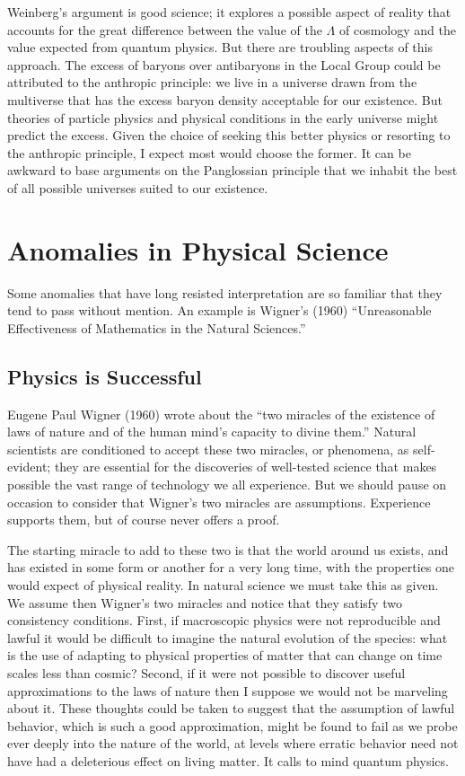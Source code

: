 \documentclass[fleqn,12pt]{article}
\begin{document}
Weinberg's argument is good science; it explores a possible aspect of reality that accounts for the great difference between the value of the $\Lambda$ of cosmology and the value expected from quantum physics. But there are troubling aspects of this approach. The excess of baryons over antibaryons in the Local Group could be attributed to the anthropic principle: we live in a universe drawn from the multiverse that has the excess baryon density acceptable for our existence. But theories of particle physics and physical conditions in the early universe might predict the excess. Given the choice of seeking this better physics or resorting to the anthropic principle, I expect most would choose the former. It can be awkward to base arguments on the Panglossian principle that we inhabit the best of all possible universes suited to our existence.

\section{Anomalies in Physical Science}\label{sec:anomalies}

Some anomalies that have long resisted interpretation are so familiar that they tend to pass without mention. An example is Wigner's (1960) ``Unreasonable Effectiveness of Mathematics in the Natural Sciences.''

\subsection{Physics is Successful} \label{PhysicsisSuccessful}

Eugene Paul Wigner (1960) wrote about the ``two miracles of the existence of laws of nature and of the human mind's capacity to divine them.'' Natural scientists are conditioned to accept these two miracles, or phenomena, as self-evident; they are essential for the discoveries of well-tested science that makes possible the vast range of technology we all experience.  But we should pause on occasion to consider that Wigner's  two miracles are assumptions. Experience supports them, but of course never offers a proof.

The starting miracle to add to these two is that the world around us exists, and has existed in some form or another for a very long time, with the properties one would expect of physical reality. In natural science we must take this as given. We assume then Wigner's two miracles and notice that they satisfy two consistency conditions. First, if macroscopic physics were not reproducible and lawful it would be difficult to imagine the natural evolution of the species: what is the use of adapting to physical properties of matter that can change on time scales less than cosmic? Second, if it were not possible to discover useful approximations to the laws of nature then I suppose we would not be marveling about it. These thoughts could be taken to suggest that the assumption of lawful behavior, which is such a good approximation, might be found to fail as we probe ever deeply into the nature of the world, at levels where erratic behavior need not have had a deleterious effect on living matter. It calls to mind quantum physics. 
\end{document}
